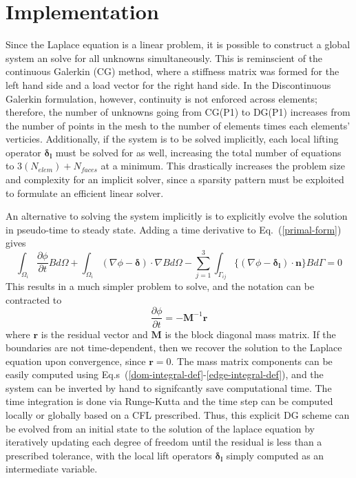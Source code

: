 \documentclass[a4paper]{article}
\newcommand{\eref}[1]{Eq.~(\ref{#1})}
\newcommand{\erefs}[2]{Eq.s~(\ref{#1}-\ref{#2})}
\newcommand{\dint}[1]{\int_{\Omega_i}{#1 d\Omega}}
\newcommand{\sint}[1]{\int_{\Gamma_{ij}}{#1 d\Gamma}}
\newcommand{\average}[1]{\ensuremath{\{#1\}} }
\newcommand{\glift}{\boldsymbol{\delta}}
\newcommand{\llift}{\boldsymbol{\delta_l}}
\newcommand{\unitn}{\mathbf{n}}
\newcommand{\mm}{\mathbf{M}}
\newcommand{\vr}{\mathbf{r}}
\begin{document}
\section{Implementation}
Since the Laplace equation is a linear problem, it is possible to construct a
global system an solve for all unknowns simultaneously.  This is reminscient of
the continuous Galerkin (CG) method, where a stiffness matrix was formed for the left
hand side and a load vector for the right hand side.  In the Discontinuous Galerkin
formulation, however, continuity is not enforced across elements; therefore, the
number of unknowns going from CG(P1) to DG(P1) increases from the number of
points in the mesh to the number of elements times each elements' verticies.
Additionally, if the system is to be solved implicitly, each local lifting
operator $\llift$ must be solved for as well, increasing the total number of
equations to $3(N_{elem})+N_{faces}$ at a minimum.  This drastically increases
the problem size and complexity for an implicit solver, since a sparsity pattern
must be exploited to formulate an efficient linear solver.

An alternative to solving the system implicitly is to explicitly evolve the
solution in pseudo-time to steady state.  Adding a time derivative to
\eref{primal-form} gives
\begin{equation}
  \dint{\frac{\partial \phi}{\partial t}B} +
  \dint{(\nabla \phi - \glift)\cdot \nabla B} -
  \sum_{j=1}^3\sint{\average{(\nabla \phi - \llift)\cdot\unitn}B} = 0
  \label{primal-w-time}
\end{equation}
This results in a much simpler problem to solve, and the notation can be
contracted to
\begin{equation}
  \frac{\partial \phi}{\partial t} = -\mm^{-1} \vr
  \label{simple-explicit}
\end{equation}
where $\vr$ is the residual vector and $\mm$ is the block diagonal mass matrix.
If the boundaries are not time-dependent, then we recover the solution to the
Laplace equation upon convergence, since $\vr= 0$.  The mass matrix components can be
easily computed using \erefs{dom-integral-def}{edge-integral-def}, and the
system can be inverted by hand to signifcantly save computational time. The time
integration is done via Runge-Kutta and the time step can be computed locally or
globally based on a CFL prescribed.  Thus, this explicit DG scheme can be
evolved from an initial state to the solution of the laplace equation by
iteratively updating each degree of freedom until the residual is less than a
prescribed tolerance, with the local lift operators $\llift$ simply computed as
an intermediate variable.
\end{document}

